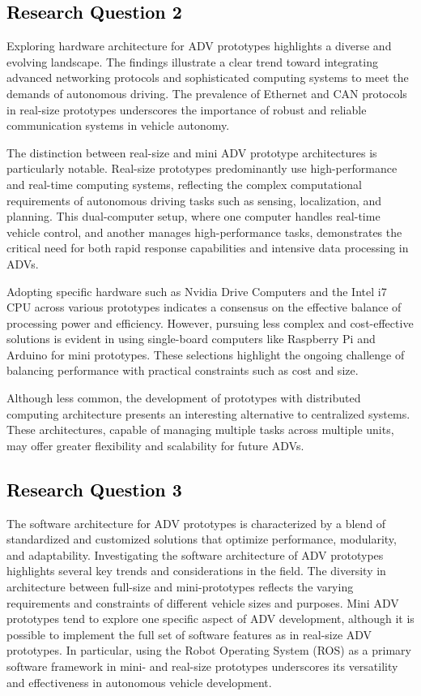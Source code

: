 \documentclass[lettersize,journal]{IEEEtran}
\begin{document}
\subsection{\textcolor{black}{\textbf{Research Question 2}}}
Exploring hardware architecture for ADV prototypes highlights a diverse and evolving landscape. The findings illustrate a clear trend toward integrating advanced networking protocols and sophisticated computing systems to meet the demands of autonomous driving. The prevalence of Ethernet and CAN protocols in real-size prototypes underscores the importance of robust and reliable communication systems in vehicle autonomy.

The distinction between real-size and mini ADV prototype architectures is particularly notable. Real-size prototypes predominantly use high-performance and real-time computing systems, reflecting the complex computational requirements of autonomous driving tasks such as sensing, localization, and planning. This dual-computer setup, where one computer handles real-time vehicle control, and another manages high-performance tasks, demonstrates the critical need for both rapid response capabilities and intensive data processing in ADVs.

Adopting specific hardware such as Nvidia Drive Computers and the Intel i7 CPU across various prototypes indicates a consensus on the effective balance of processing power and efficiency. However, pursuing less complex and cost-effective solutions is evident in using single-board computers like Raspberry Pi and Arduino for mini prototypes. These selections highlight the ongoing challenge of balancing performance with practical constraints such as cost and size.

Although less common, the development of prototypes with distributed computing architecture presents an interesting alternative to centralized systems. These architectures, capable of managing multiple tasks across multiple units, may offer greater flexibility and scalability for future ADVs.

\subsection{\textcolor{black}{\textbf{Research Question 3}}}
The software architecture for ADV prototypes is characterized by a blend of standardized and customized solutions that optimize performance, modularity, and adaptability. Investigating the software architecture of ADV prototypes highlights several key trends and considerations in the field. The diversity in architecture between full-size and mini-prototypes reflects the varying requirements and constraints of different vehicle sizes and purposes. Mini ADV prototypes tend to explore one specific aspect of ADV development, although it is possible to implement the full set of software features as in real-size ADV prototypes. In particular, using the Robot Operating System (ROS) as a primary software framework in mini- and real-size prototypes underscores its versatility and effectiveness in autonomous vehicle development.
\end{document}
